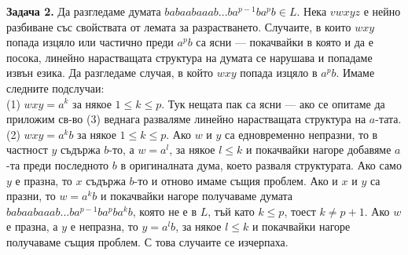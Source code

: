 \documentclass[openany]{book}
\begin{document}
    \vspace{15pt}

    \textbf{Задача 2.} Да разгледаме думата $babaabaaab...ba^{p-1}ba^pb \in L$. Нека
    $vwxyz$ е нейно разбиване със свойствата от лемата за разрастването. Случаите, в
    които $wxy$ попада изцяло или частично преди $a^pb$ са ясни — покачвайки в която
    и да е посока, линейно нарастващата структура на думата се нарушава и попадаме 
    извън езика. Да разгледаме случая, в който $wxy$ попада изцяло в $a^pb$. Имаме
    следните подслучаи: \\
    (1) $wxy = a^k$ за някое $1 \leq k \leq p$. Тук нещата пак са ясни — ако се опитаме
    да приложим св-во (3) веднага разваляме линейно нарастващата структура на $a$-тата. \\
    (2) $wxy = a^kb$ за някое $1 \leq k \leq p$. Ако $w$ и $y$ са едновременно 
    непразни, то в частност $y$ съдържа $b$-то, а $w = a^l$, за някое $l \leq k$ и покачвайки нагоре добавяме $a$-та преди
    последното $b$ в оригиналната дума, което разваля структурата. Ако само $y$ е празна,
    то $x$ съдържа $b$-то и отново имаме същия проблем. Ако и $x$ и $y$ са празни,
    то $w = a^kb$ и покачвайки нагоре получаваме думата $babaabaaab...ba^{p-1}ba^pba^kb$,
    която не е в $L$, тъй като $k \leq p$, тоест $k \neq p+1$. Ако $w$ е празна, а 
    $y$ е непразна, то $y = a^lb$, за някое $l \leq k$ и покачвайки нагоре получаваме
    същия проблем. С това случаите се изчерпаха.

    \vspace{15pt}
\end{document}
